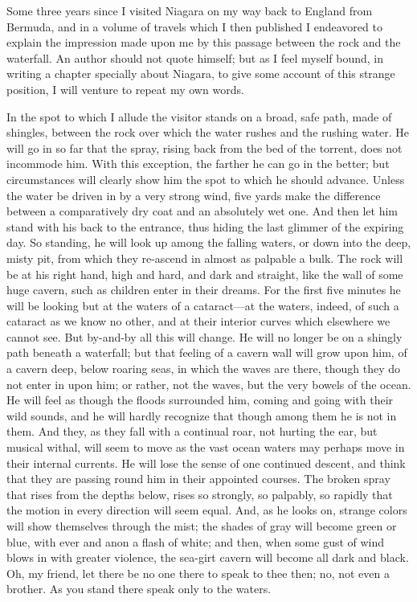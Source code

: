 Some three years since I visited Niagara on my way back to England
from Bermuda, and in a volume of travels which I then published I
endeavored to explain the impression made upon me by this passage
between the rock and the waterfall.  An author should not quote
himself; but as I feel myself bound, in writing a chapter specially
about Niagara, to give some account of this strange position, I
will venture to repeat my own words.

In the spot to which I allude the visitor stands on a broad, safe
path, made of shingles, between the rock over which the water
rushes and the rushing water.  He will go in so far that the spray,
rising back from the bed of the torrent, does not incommode him.
With this exception, the farther he can go in the better; but
circumstances will clearly show him the spot to which he should
advance.  Unless the water be driven in by a very strong wind, five
yards make the difference between a comparatively dry coat and an
absolutely wet one.  And then let him stand with his back to the
entrance, thus hiding the last glimmer of the expiring day.  So
standing, he will look up among the falling waters, or down into
the deep, misty pit, from which they re-ascend in almost as
palpable a bulk.  The rock will be at his right hand, high and
hard, and dark and straight, like the wall of some huge cavern,
such as children enter in their dreams.  For the first five minutes
he will be looking but at the waters of a cataract---at the waters,
indeed, of such a cataract as we know no other, and at their
interior curves which elsewhere we cannot see.  But by-and-by all
this will change.  He will no longer be on a shingly path beneath a
waterfall; but that feeling of a cavern wall will grow upon him, of
a cavern deep, below roaring seas, in which the waves are there,
though they do not enter in upon him; or rather, not the waves, but
the very bowels of the ocean.  He will feel as though the floods
surrounded him, coming and going with their wild sounds, and he
will hardly recognize that though among them he is not in them.
And they, as they fall with a continual roar, not hurting the ear,
but musical withal, will seem to move as the vast ocean waters may
perhaps move in their internal currents.  He will lose the sense of
one continued descent, and think that they are passing round him in
their appointed courses.  The broken spray that rises from the
depths below, rises so strongly, so palpably, so rapidly that the
motion in every direction will seem equal.  And, as he looks on,
strange colors will show themselves through the mist; the shades of
gray will become green or blue, with ever and anon a flash of
white; and then, when some gust of wind blows in with greater
violence, the sea-girt cavern will become all dark and black.  Oh,
my friend, let there be no one there to speak to thee then; no, not
even a brother.  As you stand there speak only to the waters.


